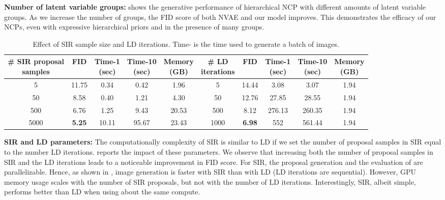 \documentclass{article} \usepackage{iclr2021_conference,times}
\begin{document}
\textbf{Number of latent variable groups:}  shows the generative performance of hierarchical NCP with different amounts of latent variable groups. 
As we increase the number of groups, the FID score of both NVAE and our model improves. This demonstrates the efficacy of our NCPs, even with expressive hierarchical priors and in the presence of many groups.

\begin{table}
\small
    \vspace{-5mm}
    \centering
    \caption{\small{Effect of SIR sample size and LD iterations. Time- is the time used to generate a batch of  images.}}
    \vspace{-5mm}
    \begin{tabular}{ccccc|ccccc}\\ \toprule  
       \makecell{\# SIR proposal \\ samples} & FID & \makecell{Time-1 \\ (sec)} & \makecell{Time-10 \\ (sec)} & \makecell{Memory \\ (GB)} & \makecell{\# LD \\iterations} &  FID & \makecell{Time-1 \\ (sec)} & \makecell{Time-10 \\ (sec)} & \makecell{Memory \\ (GB)}
        \\ \midrule
        5 & 11.75  & 0.34 & 0.42 & 1.96 & 5 & 14.44  & 3.08 & 3.07 & 1.94\\   
        50 & 8.58  & 0.40  & 1.21 & 4.30 & 50 & 12.76  & 27.85  & 28.55 & 1.94\\
        500 & 6.76 & 1.25 &9.43 & 20.53 & 500 & 8.12 & 276.13 & 260.35 & 1.94\\
        5000 & \textbf{5.25} & 10.11 &95.67 & 23.43 & 1000 & \textbf{6.98} & 552 & 561.44 & 1.94 \\
        \bottomrule
    \end{tabular}
    \label{tab: sir_ablation}
\end{table}
%
 \textbf{SIR and LD parameters:} The computationally complexity of SIR is similar to LD if we set the number of proposal samples in SIR equal to the number LD iterations.  reports the impact of these parameters. We observe that increasing both the number of proposal samples in SIR and the LD iterations leads to a noticeable improvement in  FID score. For SIR, the proposal generation and the evaluation of  are parallelizable. Hence, as shown in , image generation is faster with SIR than with LD (LD iterations are sequential). However,  GPU memory usage scales with the number of SIR proposals, but not with the number of LD iterations. Interestingly, SIR, albeit simple, performs better than LD when using about the same compute. 
\end{document}
